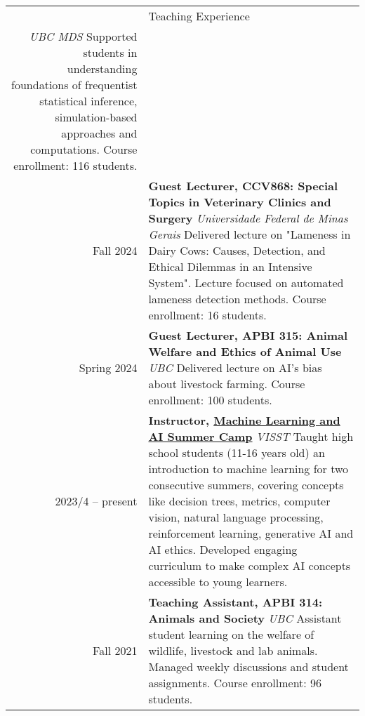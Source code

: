 \documentclass[letterpaper, 11pt]{article}
\newcommand{\headingfont}{\Large\color{OliveGreen}}
\newenvironment{SectionTable}[1]{
	\renewcommand*{\arraystretch}{1.7}
	\setlength{\tabcolsep}{10pt}
	\begin{longtable}{Rp{5.2in}} & #1 \\}
{\end{longtable}\vspace{-.3cm}}
\begin{document}
\begin{SectionTable}{\headingfont Teaching Experience}
\textit{UBC MDS} \newline
Supported students in understanding foundations of frequentist statistical inference, simulation-based approaches and  computations. Course enrollment: 116 students. \\
Fall 2024 & 
\textbf{Guest Lecturer, CCV868: Special Topics in Veterinary Clinics and Surgery} \newline
\textit{Universidade Federal de Minas Gerais} \newline
Delivered lecture on "Lameness in Dairy Cows: Causes, Detection, and Ethical Dilemmas in an Intensive System". Lecture focused on automated lameness detection methods. Course enrollment: 16 students. \\
Spring 2024 & 
\textbf{Guest Lecturer, APBI 315: Animal Welfare and Ethics of Animal Use} \newline
\textit{UBC} \newline
Delivered lecture on AI's bias about livestock farming. Course enrollment: 100 students. \\
2023/4 -- present &
\textbf{Instructor, \href{https://www.visst.ca/past-camps/machinelearningsummer}{Machine Learning and AI Summer Camp}} \newline
\textit{VISST} \newline
Taught high school students (11-16 years old) an introduction to machine learning for two consecutive summers, covering concepts like decision trees, metrics, computer vision, natural language processing, reinforcement learning, generative AI and AI ethics. Developed engaging curriculum to make complex AI concepts accessible to young learners. \\
Fall 2021 & 
\textbf{Teaching Assistant, APBI 314: Animals and Society} \newline
\textit{UBC} \newline
Assistant student learning on the welfare of wildlife, livestock and lab animals. Managed weekly discussions and student assignments. Course enrollment: 96 students.
\end{SectionTable}
\end{document}
